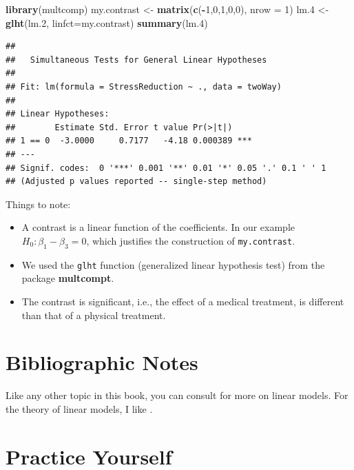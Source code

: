 \documentclass[]{book}
\newenvironment{Shaded}{\begin{snugshade}}{\end{snugshade}}
\newcommand{\KeywordTok}[1]{\textcolor[rgb]{0.13,0.29,0.53}{\textbf{#1}}}
\newcommand{\DataTypeTok}[1]{\textcolor[rgb]{0.13,0.29,0.53}{#1}}
\newcommand{\DecValTok}[1]{\textcolor[rgb]{0.00,0.00,0.81}{#1}}
\newcommand{\StringTok}[1]{\textcolor[rgb]{0.31,0.60,0.02}{#1}}
\newcommand{\OperatorTok}[1]{\textcolor[rgb]{0.81,0.36,0.00}{\textbf{#1}}}
\newcommand{\NormalTok}[1]{#1}
\providecommand{\tightlist}{%
  \setlength{\itemsep}{0pt}\setlength{\parskip}{0pt}}
\theoremstyle{definition}
\theoremstyle{definition}
\theoremstyle{definition}
\theoremstyle{remark}
\begin{document}
\begin{Shaded}
\begin{Highlighting}[]
\KeywordTok{library}\NormalTok{(multcomp)}
\NormalTok{my.contrast <-}\StringTok{ }\KeywordTok{matrix}\NormalTok{(}\KeywordTok{c}\NormalTok{(}\OperatorTok{-}\DecValTok{1}\NormalTok{,}\DecValTok{0}\NormalTok{,}\DecValTok{1}\NormalTok{,}\DecValTok{0}\NormalTok{,}\DecValTok{0}\NormalTok{), }\DataTypeTok{nrow =}  \DecValTok{1}\NormalTok{)}
\NormalTok{lm.}\DecValTok{4}\NormalTok{ <-}\StringTok{ }\KeywordTok{glht}\NormalTok{(lm.}\DecValTok{2}\NormalTok{, }\DataTypeTok{linfct=}\NormalTok{my.contrast)}
\KeywordTok{summary}\NormalTok{(lm.}\DecValTok{4}\NormalTok{)}
\end{Highlighting}
\end{Shaded}

\begin{verbatim}
## 
##   Simultaneous Tests for General Linear Hypotheses
## 
## Fit: lm(formula = StressReduction ~ ., data = twoWay)
## 
## Linear Hypotheses:
##        Estimate Std. Error t value Pr(>|t|)    
## 1 == 0  -3.0000     0.7177   -4.18 0.000389 ***
## ---
## Signif. codes:  0 '***' 0.001 '**' 0.01 '*' 0.05 '.' 0.1 ' ' 1
## (Adjusted p values reported -- single-step method)
\end{verbatim}

Things to note:

\begin{itemize}
\tightlist
\item
  A contrast is a linear function of the coefficients. In our example
  \(H_0:\beta_1-\beta_3=0\), which justifies the construction of
  \texttt{my.contrast}.
\item
  We used the \texttt{glht} function (generalized linear hypothesis
  test) from the package \textbf{multcompt}.
\item
  The contrast is significant, i.e., the effect of a medical treatment,
  is different than that of a physical treatment.
\end{itemize}

\section{Bibliographic Notes}\label{bibliographic-notes-3}

Like any other topic in this book, you can consult
\citet{venables2013modern} for more on linear models. For the theory of
linear models, I like \citet{greene2003econometric}.

\section{Practice Yourself}\label{practice-yourself-3}
\end{document}
